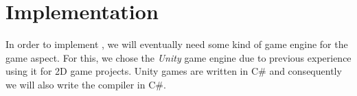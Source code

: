 \chapter{Implementation} \label{chap:implementation}
In order to implement \dazel{}, we will eventually need some kind of game engine for the game aspect.
For this, we chose the \textit{Unity} game engine\cite{technologies_unity_nodate} due to previous experience using it for 2D game projects.
Unity games are written in C\# and consequently we will also write the \dazel{} compiler in C\#. 